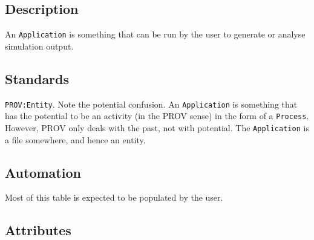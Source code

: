 \documentclass[
]{article}
\begin{document}
\subsection{Description}\label{description}

An \texttt{Application} is something that can be run by the user to
generate or analyse simulation output.

\subsection{Standards}\label{standards-1}

\texttt{PROV:Entity}. Note the potential confusion. An
\texttt{Application} is something that has the potential to be an
activity (in the PROV sense) in the form of a \texttt{Process}. However,
PROV only deals with the past, not with potential. The
\texttt{Application} is a file somewhere, and hence an entity.

\subsection{Automation}\label{automation-1}

Most of this table is expected to be populated by the user.

\subsection{Attributes}\label{attributes-2}
\end{document}

